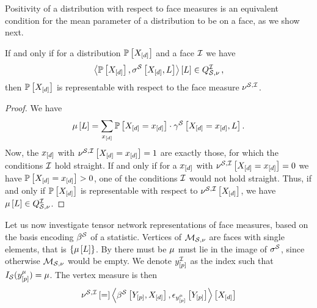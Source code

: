 Positivity of a distribution with respect to face measures is an equivalent condition for the mean parameter of a distribution to be on a face, as we show next.

\begin{theorem}\label{the:facePolytopeCharacterization}
    If and only if for a distribution $\mathbb{P}\left[X_{[d]}\right]$ and a face $\mathcal{I}$ we have
    \begin{align*}
        \left\langle \mathbb{P}\left[X_{[d]}\right],\sigma^{\mathcal{S}}\left[X_{[d]},L\right]\right\rangle \left[ L \right]\in Q^{\mathcal{I}}_{\mathcal{S},\nu}\, ,
    \end{align*}
    then $\mathbb{P}\left[X_{[d]}\right]$ is representable with respect to the face measure $\nu^{\mathcal{S},\mathcal{I}}$.
\end{theorem}
\begin{proof}
    We have
    \begin{align*}
        \mu\left[L\right] = \sum_{x_{[d]}} \mathbb{P}\left[X_{[d]}=x_{[d]}\right]\cdot\gamma^{\mathcal{S}}\left[X_{[d]}=x_{[d]},L\right] .
    \end{align*}
    Now, the $x_{[d]}$ with $\nu^{\mathcal{S},\mathcal{I}}\left[X_{[d]}=x_{[d]}\right]=1$ are exactly those, for which the conditions $\mathcal{I}$ hold straight.
    If and only if for a $x_{[d]}$ with $\nu^{\mathcal{S},\mathcal{I}}\left[X_{[d]}=x_{[d]}\right]=0$ we have $\mathbb{P}\left[X_{[d]}=x_{[d]}\right]>0$, one of the conditions $\mathcal{I}$ would not hold straight.
    Thus, if and only if $\mathbb{P}\left[X_{[d]}\right]$ is representable with respect to $\nu^{\mathcal{S},\mathcal{I}}\left[X_{[d]}\right]$, we have $\mu\left[L\right]\in Q^{\mathcal{I}}_{\mathcal{S},\nu}$.
\end{proof}


Let us now investigate tensor network representations of face measures, based on the basis encoding $\beta^{\mathcal{S}}$ of a statistic.
Vertices of $\mathcal{M}_{\mathcal{S},\nu}$ are faces with single elements, that is $\{\mu\left[L\right]\}$.
By  there must be $\mu$ must lie in the image of $\sigma^{\mathcal{S}}$, since otherwise $\mathcal{M}_{\mathcal{S},\nu}$ would be empty.
We denote $y^{\mathcal{I}}_{[p]}$ as the index such that $I_{\mathcal{S}}(y^{\mu}_{[p]})=\mu$.
The vertex measure is then
\begin{align*}
    \nu^{\mathcal{S},\mathcal{I}}\left[=\right] \left\langle \beta^{\mathcal{S}}\left[Y_{[p]},X_{[d]}\right],\epsilon_{y^{\mu}_{[p]}}\left[Y_{[p]}\right]\right\rangle \left[ X_{[d]} \right]
\end{align*}

